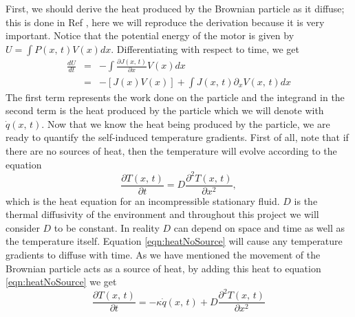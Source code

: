 First, we should derive the heat produced by the Brownian particle as it diffuse; this is done in Ref \cite{M.W.Jack2016}, here we will reproduce the derivation because it is very important. Notice that the potential energy of the motor is given by $U = \int P(x, \, t) V(x) dx$. Differentiating with respect to time, we get
\begin{eqnarray}
\frac{d U}{d t} &=& -\int \frac{\partial J(x, \, t)}{\partial x} V(x) dx \\
		        &=& -[J(x) V(x)] + \int J(x, \, t) \partial_x V(x, \, t) dx
\end{eqnarray}
The first term represents the work done on the particle and the integrand in the second term is the heat produced by the particle which we will denote with $\dot{q}(x, \, t)$. Now that we know the heat being produced by the particle, we are ready to quantify the self-induced temperature gradients. First of all, note that if there are no sources of heat, then the temperature will evolve according to the equation
\begin{equation}
\frac{\partial T(x, \, t)}{\partial t} = D\frac{\partial^2 T(x, \, t)}{\partial x^2}, \label{eqn:heatNoSource}
\end{equation} 
which is the heat equation for an incompressible stationary fluid. $D$ is the thermal diffusivity of the environment and throughout this project we will consider $D$ to be constant. In reality $D$ can depend on space and time as well as the temperature itself. Equation \ref{eqn:heatNoSource} will cause any temperature gradients to diffuse with time. As we have mentioned the movement of the Brownian particle acts as a source of heat, by adding this heat to equation \ref{eqn:heatNoSource} we get
\begin{equation}
\frac{\partial T(x, \, t)}{\partial t} = -\kappa \dot{q}(x, \, t) + D \frac{\partial^2 T(x, \, t)}{\partial x^2}
\end{equation}



